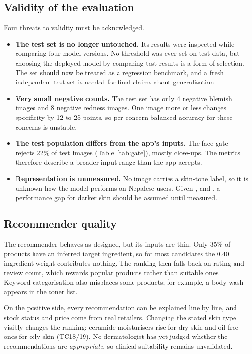 \subsection*{Validity of the evaluation}

Four threats to validity must be acknowledged.

\begin{itemize}
  \item \textbf{The test set is no longer untouched.} Its results were inspected while comparing four model versions. No threshold was ever set on test data, but choosing the deployed model by comparing test results is a form of selection. The set should now be treated as a regression benchmark, and a fresh independent test set is needed for final claims about generalisation.
  \item \textbf{Very small negative counts.} The test set has only 4 negative blemish images and 8 negative redness images. One image more or less changes specificity by 12 to 25 points, so per-concern balanced accuracy for these concerns is unstable.
  \item \textbf{The test population differs from the app's inputs.} The face gate rejects 22\% of test images (Table~\ref{tab:gate}), mostly close-ups. The metrics therefore describe a broader input range than the app accepts.
  \item \textbf{Representation is unmeasured.} No image carries a skin-tone label, so it is unknown how the model performs on Nepalese users. Given \citet{groh2021}, \citet{daneshjou2021} and \citet{daneshjou2022}, a performance gap for darker skin should be assumed until measured.
\end{itemize}

\subsection*{Recommender quality}

The recommender behaves as designed, but its inputs are thin. Only 35\% of products have an inferred target ingredient, so for most candidates the 0.40 ingredient weight contributes nothing. The ranking then falls back on rating and review count, which rewards popular products rather than suitable ones. Keyword categorisation also misplaces some products; for example, a body wash appears in the toner list.

On the positive side, every recommendation can be explained line by line, and stock status and price come from real retailers. Changing the stated skin type visibly changes the ranking: ceramide moisturisers rise for dry skin and oil-free ones for oily skin (TC18/19). No dermatologist has yet judged whether the recommendations are \emph{appropriate}, so clinical suitability remains unvalidated.

